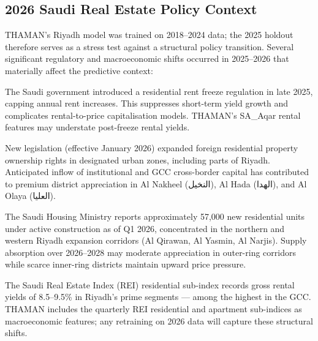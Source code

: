 \documentclass[11pt, a4paper, twoside]{article}
\begin{document}
\subsection{2026 Saudi Real Estate Policy Context}
\label{sec:riyadh_macro}
THAMAN's Riyadh model was trained on 2018--2024 data; the 2025 holdout
therefore serves as a stress test against a structural policy transition.
Several significant regulatory and macroeconomic shifts occurred in
2025--2026 that materially affect the predictive context:

\begin{description}[style=nextline]
  \item[Rent Freeze (late 2025)]
        The Saudi government introduced a residential rent freeze regulation
        in late 2025, capping annual rent increases. This suppresses
        short-term yield growth and complicates rental-to-price
        capitalisation models. THAMAN's SA\_Aqar rental features may
        understate post-freeze rental yields.

  \item[Foreign Ownership Reform (January 2026)]
        New legislation (effective January 2026) expanded foreign residential
        property ownership rights in designated urban zones, including parts
        of Riyadh. Anticipated inflow of institutional and GCC cross-border
        capital has contributed to premium district appreciation in
        Al Nakheel (النخيل), Al Hada (الهدا), and Al Olaya (العليا).

  \item[57,000-Unit Supply Pipeline]
        The Saudi Housing Ministry reports approximately 57,000 new
        residential units under active construction as of Q1 2026,
        concentrated in the northern and western Riyadh expansion corridors
        (Al Qirawan, Al Yasmin, Al Narjis). Supply absorption over
        2026--2028 may moderate appreciation in outer-ring corridors while
        scarce inner-ring districts maintain upward price pressure.

  \item[REI and Yield Environment]
        The Saudi Real Estate Index (REI) residential sub-index records
        gross rental yields of 8.5--9.5\% in Riyadh's prime segments ---
        among the highest in the GCC. THAMAN includes the quarterly REI
        residential and apartment sub-indices as macroeconomic features;
        any retraining on 2026 data will capture these structural shifts.
\end{description}
\end{document}
